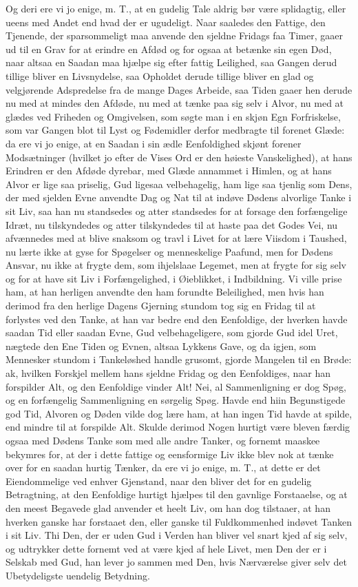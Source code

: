 \documentclass[12pt,a4paper]{article}
\begin{document}
Og deri ere vi jo enige, m. T., at en gudelig Tale aldrig bør være splidagtig, eller ueens med Andet end hvad der er ugudeligt. Naar saaledes den Fattige, den Tjenende, der sparsommeligt maa anvende den sjeldne Fridags faa Timer, gaaer ud til en Grav for at erindre en Afdød og for ogsaa at betænke sin egen Død, naar altsaa en Saadan maa hjælpe sig efter fattig Leilighed, saa Gangen derud tillige bliver en Livsnydelse, saa Opholdet derude tillige bliver en glad og velgjørende Adspredelse fra de mange Dages Arbeide, saa Tiden gaaer hen derude nu med at mindes den Afdøde, nu med at tænke paa sig selv i Alvor, nu med at glædes ved Friheden og Omgivelsen, som søgte man i en skjøn Egn Forfriskelse, som var Gangen blot til Lyst og Fødemidler derfor medbragte til forenet Glæde: da ere vi jo enige, at en Saadan i sin ædle Eenfoldighed skjønt forener Modsætninger (hvilket jo efter de Vises Ord er den høieste Vanskelighed), at hans Erindren er den Afdøde dyrebar, med Glæde annammet i Himlen, og at hans Alvor er lige saa priselig, Gud ligesaa velbehagelig, ham lige saa tjenlig som Dens, der med sjelden Evne anvendte Dag og Nat til at indøve Dødens alvorlige Tanke i sit Liv, saa han nu standsedes og atter standsedes for at forsage den forfængelige Idræt, nu tilskyndedes og atter tilskyndedes til at haste paa det Godes Vei, nu afvænnedes med at blive snaksom og travl i Livet for at lære Viisdom i Taushed, nu lærte ikke at gyse for Spøgelser og menneskelige Paafund, men for Dødens Ansvar, nu ikke at frygte dem, som ihjelslaae Legemet, men at frygte for sig selv og for at have sit Liv i Forfængelighed, i Øieblikket, i Indbildning. Vi ville prise ham, at han herligen anvendte den ham forundte Beleilighed, men hvis han derimod fra den herlige Dagens Gjerning stundom tog sig en Fridag til at forlystes ved den Tanke, at han var bedre end den Eenfoldige, der hverken havde saadan Tid eller saadan Evne, Gud velbehageligere, som gjorde Gud idel Uret, nægtede den Ene Tiden og Evnen, altsaa Lykkens Gave, og da igjen, som Mennesker stundom i Tankeløshed handle grusomt, gjorde Mangelen til en Brøde: ak, hvilken Forskjel mellem hans sjeldne Fridag og den Eenfoldiges, naar han forspilder Alt, og den Eenfoldige vinder Alt! Nei, al Sammenligning er dog Spøg, og en forfængelig Sammenligning en sørgelig Spøg. Havde end hiin Begunstigede god Tid, Alvoren og Døden vilde dog lære ham, at han ingen Tid havde at spilde, end mindre til at forspilde Alt. Skulde derimod Nogen hurtigt være bleven færdig ogsaa med Dødens Tanke som med alle andre Tanker, og fornemt maaskee bekymres for, at der i dette fattige og eensformige Liv ikke blev nok at tænke over for en saadan hurtig Tænker, da ere vi jo enige, m. T., at dette er det Eiendommelige ved enhver Gjenstand, naar den bliver det for en gudelig Betragtning, at den Eenfoldige hurtigt hjælpes til den gavnlige Forstaaelse, og at den meest Begavede glad anvender et heelt Liv, om han dog tilstaaer, at han hverken ganske har forstaaet den, eller ganske til Fuldkommenhed indøvet Tanken i sit Liv. Thi Den, der er uden Gud i Verden han bliver vel snart kjed af sig selv, og udtrykker dette fornemt ved at være kjed af hele Livet, men Den der er i Selskab med Gud, han lever jo sammen med Den, hvis Nærværelse giver selv det Ubetydeligste uendelig Betydning.
\end{document}
